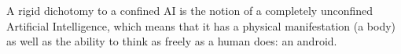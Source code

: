 A rigid dichotomy to a confined AI is the notion of a completely unconfined Artificial Intelligence, which means that it has a physical manifestation (a body) as well as the ability to think as freely as a human does: an android.
